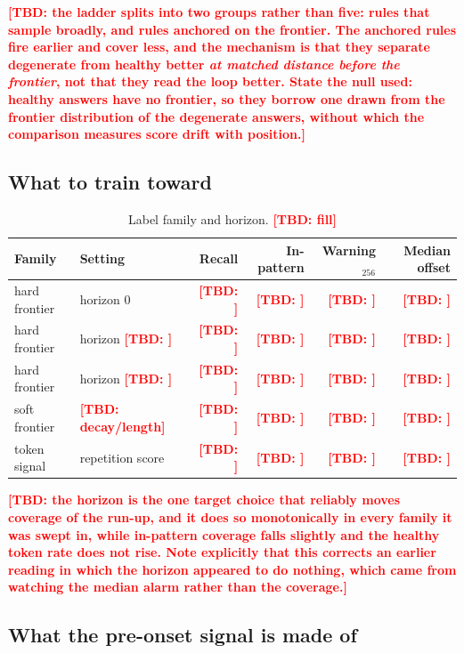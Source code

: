\documentclass{article}
\newcommand{\TBD}[1]{\textcolor{red}{\textbf{[TBD: #1]}}}
\begin{document}
\TBD{the ladder splits into two groups rather than five: rules that sample
broadly, and rules anchored on the frontier. The anchored rules fire earlier and
cover less, and the mechanism is that they separate degenerate from healthy
better \emph{at matched distance before the frontier}, not that they read the
loop better. State the null used: healthy answers have no frontier, so they
borrow one drawn from the frontier distribution of the degenerate answers,
without which the comparison measures score drift with position.}

\subsection{What to train toward}
\label{sec:exp-targets}

\begin{table}[t]
  \caption{Label family and horizon. \TBD{fill}}
  \label{tab:targets}
  \centering
  \small
  \begin{tabular}{llrrrr}
    \toprule
    Family & Setting & Recall & In-pattern & Warning$_{256}$ & Median offset \\
    \midrule
    hard frontier & horizon $0$        & \TBD{} & \TBD{} & \TBD{} & \TBD{} \\
    hard frontier & horizon \TBD{}     & \TBD{} & \TBD{} & \TBD{} & \TBD{} \\
    hard frontier & horizon \TBD{}     & \TBD{} & \TBD{} & \TBD{} & \TBD{} \\
    soft frontier & \TBD{decay/length} & \TBD{} & \TBD{} & \TBD{} & \TBD{} \\
    token signal  & repetition score   & \TBD{} & \TBD{} & \TBD{} & \TBD{} \\
    \bottomrule
  \end{tabular}
\end{table}

\TBD{the horizon is the one target choice that reliably moves coverage of the
run-up, and it does so monotonically in every family it was swept in, while
in-pattern coverage falls slightly and the healthy token rate does not rise. Note
explicitly that this corrects an earlier reading in which the horizon appeared to
do nothing, which came from watching the median alarm rather than the coverage.}

\subsection{What the pre-onset signal is made of}
\label{sec:exp-controls}
\end{document}
